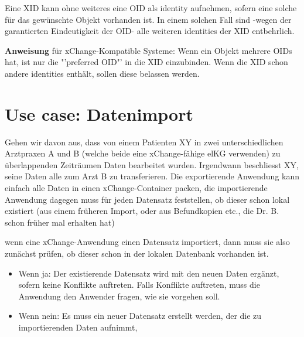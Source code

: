 \documentclass[a4paper]{scrartcl}
\begin{document}
Eine XID kann ohne weiteres eine OID als identity aufnehmen, sofern eine solche für das gewünschte Objekt vorhanden ist. In einem solchen Fall sind -wegen der garantierten Eindeutigkeit der OID- alle weiteren identities der XID entbehrlich.

\textbf{Anweisung} für xChange-Kompatible Systeme: Wenn ein Objekt mehrere OIDs hat, ist nur die "'preferred OID"' in die XID einzubinden. Wenn die XID schon andere identities enthält, sollen diese belassen werden.


\section{Use case: Datenimport}
Gehen wir davon aus, dass von einem Patienten XY in zwei unterschiedlichen Arztpraxen A und B (welche beide eine xChange-fähige elKG verwenden) zu überlappenden Zeiträumen Daten bearbeitet wurden. Irgendwann beschliesst XY, seine Daten alle zum Arzt B zu transferieren. Die exportierende Anwendung kann einfach alle Daten in einen xChange-Container packen, die importierende Anwendung dagegen muss für jeden Datensatz feststellen, ob dieser schon lokal existiert (aus einem früheren Import, oder aus Befundkopien etc., die Dr. B. schon früher mal erhalten hat)

wenn eine xChange-Anwendung einen Datensatz importiert, dann muss sie also zunächst prüfen, ob dieser schon in der lokalen Datenbank vorhanden ist.
\begin{itemize}
\item Wenn ja: Der existierende Datensatz wird mit den neuen Daten ergänzt, sofern keine Konflikte auftreten. Falls Konflikte auftreten, muss die Anwendung den Anwender fragen, wie sie vorgehen soll.
\item Wenn nein: Es muss ein neuer Datensatz erstellt werden, der die zu importierenden Daten aufnimmt,
\end{itemize}
\end{document}
